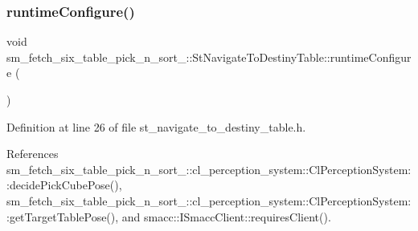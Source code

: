 \subsubsection{\texorpdfstring{runtime\+Configure()}{runtimeConfigure()}}
{\footnotesize\ttfamily void sm\+\_\+fetch\+\_\+six\+\_\+table\+\_\+pick\+\_\+n\+\_\+sort\+\_\+::\+St\+Navigate\+To\+Destiny\+Table\+::runtime\+Configure (\begin{DoxyParamCaption}{ }\end{DoxyParamCaption})\hspace{0.3cm}{\ttfamily [inline]}}



Definition at line 26 of file st\+\_\+navigate\+\_\+to\+\_\+destiny\+\_\+table.\+h.



References sm\+\_\+fetch\+\_\+six\+\_\+table\+\_\+pick\+\_\+n\+\_\+sort\+\_\+::cl\+\_\+perception\+\_\+system\+::\+Cl\+Perception\+System\+::decide\+Pick\+Cube\+Pose(), sm\+\_\+fetch\+\_\+six\+\_\+table\+\_\+pick\+\_\+n\+\_\+sort\+\_\+::cl\+\_\+perception\+\_\+system\+::\+Cl\+Perception\+System\+::get\+Target\+Table\+Pose(), and smacc\+::\+I\+Smacc\+Client\+::requires\+Client().



